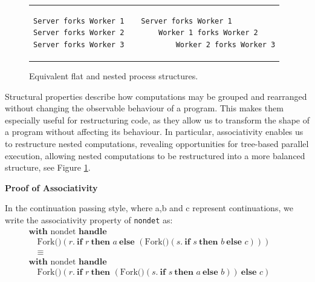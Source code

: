 \documentclass[logo,bsc,singlespacing,parskip]{infthesis}
\begin{document}
\vspace{-1em} %
\begin{figure}[H]
    \centering
    \begin{tabular}{p{} c p{}}
        \begin{lstlisting}
Server forks Worker 1
Server forks Worker 2
Server forks Worker 3
        \end{lstlisting}
        &
        &
        \begin{lstlisting}
Server forks Worker 1
    Worker 1 forks Worker 2
        Worker 2 forks Worker 3
        \end{lstlisting}
    \end{tabular}
    \vspace{-1em} %

    \caption{Equivalent flat and nested process structures.}
    \label{fig:process-restructuring}
\end{figure}

Structural properties describe how computations may be grouped and rearranged without changing the observable behaviour of a program. This makes them especially useful for restructuring code, as they allow us to transform the shape of a program without affecting its behaviour. In particular, associativity enables us to restructure nested computations, revealing opportunities for tree-based parallel execution, allowing nested computations to be restructured into a more balanced structure, see Figure  \ref{fig:process-restructuring}.



\vspace{1em}
\textbf{\large{Proof of Associativity}}

In the continuation passing style, where a,b and c represent continuations, we  write the associativity property of \lstinline{nondet} as:
\[
\begin{array}{lcl}

\textbf{with } \text{nondet } \textbf{handle} &
\quad \\ \quad \text{Fork()}(r.\ \textbf{if } r\ \textbf{then } a\ \textbf{else } (\text{Fork()}(s.\ \textbf{if } s\ \textbf{then } b\ \textbf{else } c)))
& \\ \quad\equiv \\
\textbf{with } \text{nondet } \textbf{handle} &
\quad \\ \quad \text{Fork()}(r.\ \textbf{if } r\ \textbf{then } (\text{Fork()}(s.\ \textbf{if } s\ \textbf{then } a\ \textbf{else } b))\ \textbf{else } c)
\end{array}
\]
\end{document}
